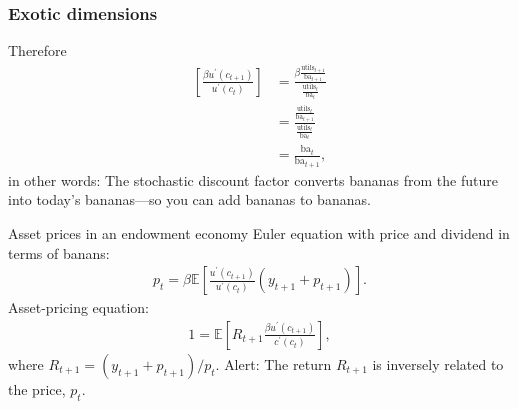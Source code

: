 \documentclass[presentation]{beamer}
\begin{document}
\begin{frame}
\frametitle{Exotic dimensions}
Therefore
\begin{align*}
\left[ \frac{\beta u^{\prime}(c_{t+1})}{u^{\prime}(c_{t})} \right] &= \frac{\beta \frac{\text{utils}_{t+1}}{\text{ba}_{t+1}}}{\frac{\text{utils}_{t}}{\text{ba$_{t}$}}} \\
&= \frac{\frac{\text{utils}_{t}}{\text{ba}_{t+1}}}{\frac{\text{utils}_{t}}{\text{ba$_{t}$}}} \\
&= \frac{\text{ba$_{t}$}}{\text{ba}_{t+1}},
\end{align*}
in other words: The stochastic discount factor converts bananas from the future into today's bananas---so you can add bananas to bananas.
\end{frame}


\begin{frame}[label=sec-4-2]{Asset prices in an endowment economy}
Euler equation with price and dividend in terms of banans:
\begin{align*}
p_{t} = \beta \mathbb{E} \left[ \frac{u^{\prime}(c_{t+1})}{u^{\prime}(c_{t})} (y_{t+1}+p_{t+1}) \right].
\end{align*}
Asset-pricing equation:
\begin{align*}
1 = \mathbb{E} \left[ R_{t+1} \frac{\beta u^{\prime}(c_{t+1})}{c^{\prime}(c_{t})} \right],
\end{align*}
where $R_{t+1} = (y_{t+1} + p_{t+1})/p_{t}$.
\alert{Alert}: The return $R_{t+1}$ is inversely related to the price, $p_{t}$.
\end{frame}
\end{document}

